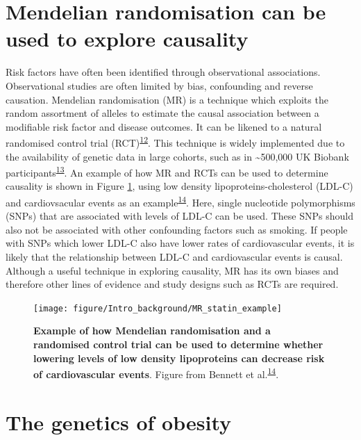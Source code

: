 \documentclass[11pt,twoside]{bristolthesis}
\begin{document}
\hypertarget{mendelian-randomisation-can-be-used-to-explore-causality}{%
\section{Mendelian randomisation can be used to explore causality}\label{mendelian-randomisation-can-be-used-to-explore-causality}}

Risk factors have often been identified through observational associations. Observational studies are often limited by bias, confounding and reverse causation. Mendelian randomisation (MR) is a technique which exploits the random assortment of alleles to estimate the causal association between a modifiable risk factor and disease outcomes. It can be likened to a natural randomised control trial (RCT)\textsuperscript{\protect\hyperlink{ref-Gill2020}{12}}. This technique is widely implemented due to the availability of genetic data in large cohorts, such as in \textasciitilde500,000 UK Biobank participants\textsuperscript{\protect\hyperlink{ref-Bycroft2018}{13}}. An example of how MR and RCTs can be used to determine causality is shown in Figure \ref{fig:MR-statins}, using low density lipoproteins-cholesterol (LDL-C) and cardiovsacular events as an example\textsuperscript{\protect\hyperlink{ref-Bennett2017}{14}}. Here, single nucleotide polymorphisms (SNPs) that are associated with levels of LDL-C can be used. These SNPs should also not be associated with other confounding factors such as smoking. If people with SNPs which lower LDL-C also have lower rates of cardiovascular events, it is likely that the relationship between LDL-C and cardiovascular events is causal. Although a useful technique in exploring causality, MR has its own biases and therefore other lines of evidence and study designs such as RCTs are required.



\begin{figure}
\texttt{[image: figure/Intro\_background/MR\_statin\_example]} \caption[Mendelian randomisation example using LDL levels and cardiovascular events]{\textbf{Example of how Mendelian randomisation and a randomised control trial can be used to determine whether lowering levels of low density lipoproteins can decrease risk of cardiovascular events}. Figure from Bennett et al.\textsuperscript{\protect\hyperlink{ref-Bennett2017}{14}}.}\label{fig:MR-statins}
\end{figure}
\hypertarget{the-genetics-of-obesity}{%
\section{The genetics of obesity}\label{the-genetics-of-obesity}}
\end{document}
